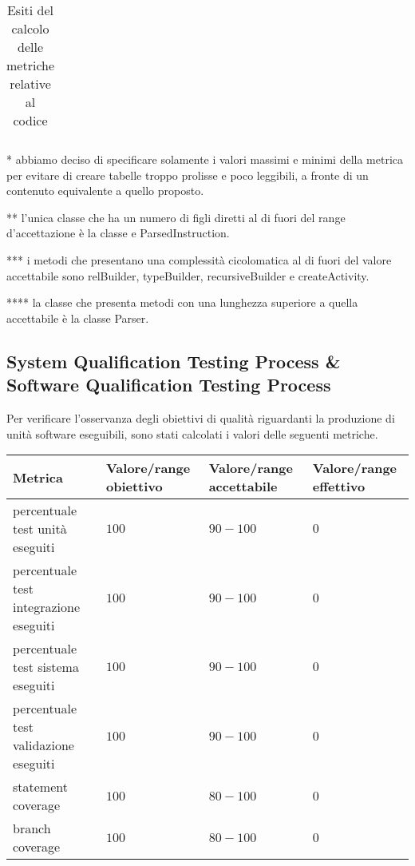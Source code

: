\begin{longtable}{|p{5.5cm}|p{2.25cm}|p{2.25cm}|p{2.25cm}|}
		\caption{Esiti del calcolo delle metriche relative al codice}
		\end{longtable}
	* abbiamo deciso di specificare solamente i valori massimi e minimi della metrica per evitare di creare tabelle troppo prolisse e poco leggibili, a fronte di un contenuto equivalente a quello proposto.
	
	** l'unica classe che ha un numero di figli diretti al di fuori del range d'accettazione è la classe e ParsedInstruction.
	
	*** i metodi che presentano una complessità cicolomatica al di fuori del valore accettabile sono relBuilder, typeBuilder, recursiveBuilder e createActivity.
	
	**** la classe che presenta metodi con una lunghezza superiore a quella accettabile è la classe Parser.
	
	
	\subsection{System Qualification Testing Process \& Software Qualification Testing Process}
		Per verificare l'osservanza degli obiettivi di qualità riguardanti la produzione di unità software eseguibili, sono stati calcolati i valori delle seguenti metriche.
		
	\begin{center}
\begin{tabular}{| p{6cm} | p{2.5cm} | p{2.5cm} | p{2.5cm} |}
	\hline
	\textbf{Metrica} & \textbf{Valore/range obiettivo} & \textbf{Valore/range accettabile} & \textbf{Valore/range effettivo} \\
	\hline
	percentuale test unità eseguiti & $100$ & $90-100$ & $0$\\
	\hline
	percentuale test integrazione eseguiti & $100$ & $90-100$ & $0$\\
	\hline
	percentuale test sistema eseguiti & $100$ & $90-100$ & $0$\\
	\hline
	percentuale test validazione eseguiti & $100$ & $90-100$ & $0$\\
	\hline
	statement coverage &$100$&$80-100$&$0$\\
	\hline
	branch coverage &$100$&$80-100$&$0$\\
	\hline
\end{tabular}
\end{center}
	
	




